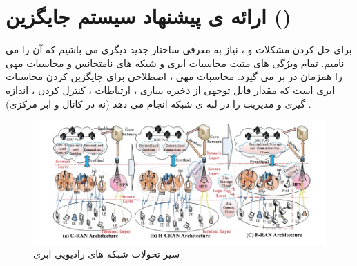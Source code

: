 \section{ارائه ی پیشنهاد سیستم جایگزین ()}
برای حل کردن مشکلات  و ، نیاز به معرفی ساختار جدید دیگری می باشیم که آن را  می نامیم.
 تمام ویژگی های مثبت محاسبات ابری و شبکه های نامتجانس و محاسبات مهی را همزمان در بر می گیرد.
محاسبات مهی ، اصطلاحی برای جایگزین کردن محاسبات ابری است که مقدار قابل توجهی از ذخیره سازی ، ارتباطات ، کنترل کردن ، اندازه گیری و مدیریت را در لبه ی شبکه انجام می دهد (نه در کانال و ابر مرکزی) \cite{fogComputing, fogEdge,fog12}.
\begin{figure}
  \centering
    \includegraphics[scale = 0.7]{fhc}
  \caption{ سیر تحولات شبکه های رادیویی ابری \cite{fogComputing}}
  \label{fig:fhc}
\end{figure}
